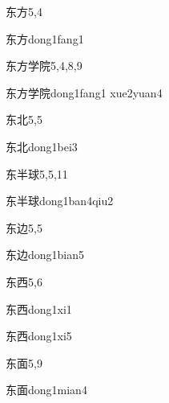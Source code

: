 \begin{entry}{东方}{5,4}
  \begin{phonetics}{东方}{dong1fang1}
  \end{phonetics}
\end{entry}

\begin{entry}{东方学院}{5,4,8,9}
  \begin{phonetics}{东方学院}{dong1fang1 xue2yuan4}
  \end{phonetics}
\end{entry}

\begin{entry}{东北}{5,5}
  \begin{phonetics}{东北}{dong1bei3}
  \end{phonetics}
\end{entry}

\begin{entry}{东半球}{5,5,11}
  \begin{phonetics}{东半球}{dong1ban4qiu2}
  \end{phonetics}
\end{entry}

\begin{entry}{东边}{5,5}
  \begin{phonetics}{东边}{dong1bian5}
  \end{phonetics}
\end{entry}

\begin{entry}{东西}{5,6}
  \begin{phonetics}{东西}{dong1xi1}
  \end{phonetics}
  \begin{phonetics}{东西}{dong1xi5}
  \end{phonetics}
\end{entry}

\begin{entry}{东面}{5,9}
  \begin{phonetics}{东面}{dong1mian4}
  \end{phonetics}
\end{entry}

